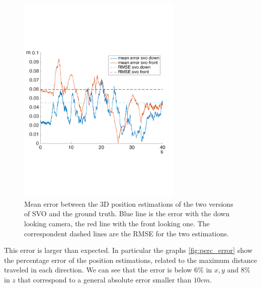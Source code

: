 \begin{figure}[!ht]
    \centering
    \includegraphics[width=0.7\textwidth]{img/comparision_between_two_svo_and_opti_error.pdf}
    \caption{Mean error between the 3D position estimations of the two versions of SVO and the ground truth. Blue line is the error with the down looking camera, the red line with the front looking one. The correspondent dashed lines are the RMSE for the two estimations.}
    \label{fig:comparision_svo_error}
\end{figure}

This error is larger than expected. In particular the graphs \ref{fig:perc_error} show the percentage error of the position estimations, related to the maximum distance traveled in each direction. We can see that the error is below $6\%$ in $x,y$ and $8\%$ in $z$ that correspond to a general absolute error smaller than $10cm$.

